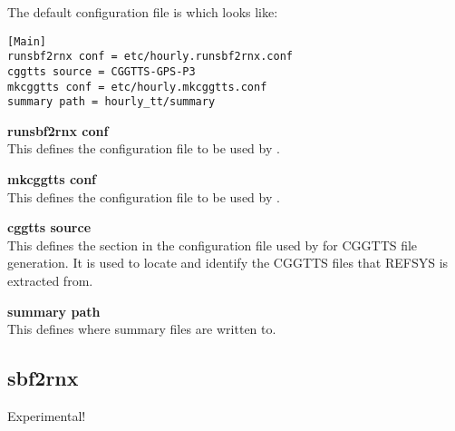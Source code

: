 The default configuration file is  which looks like:
\begin{lstlisting}
[Main]
runsbf2rnx conf = etc/hourly.runsbf2rnx.conf
cggtts source = CGGTTS-GPS-P3
mkcggtts conf = etc/hourly.mkcggtts.conf
summary path = hourly_tt/summary
\end{lstlisting}

{\bfseries runsbf2rnx conf}\\
This defines the configuration file to be used by .

{\bfseries mkcggtts conf}\\
This defines the configuration file to be used by .

{\bfseries cggtts source}\\
This defines the section in the configuration file used by  for CGGTTS file generation.
It is used to locate and identify the CGGTTS files that REFSYS is extracted from.

{\bfseries summary path }\\
This defines where summary files are written to.

\subsection{sbf2rnx}
Experimental!
